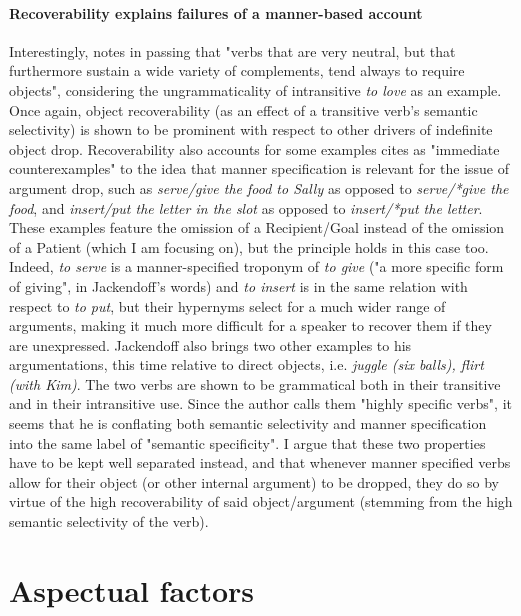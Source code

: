 \paragraph{Recoverability explains failures of a manner-based account}
Interestingly, \textcite[207]{Rice1988} notes in passing that "verbs that are very neutral, but that furthermore sustain a wide variety of complements, tend always to require objects", considering the ungrammaticality of intransitive \textit{to love} as an example. Once again, object recoverability (as an effect of a transitive verb's semantic selectivity) is shown to be prominent with respect to other drivers of indefinite object drop. Recoverability also accounts for some examples \textcite[134]{Jackendoff2003} cites as "immediate counterexamples" to the idea that manner specification is relevant for the issue of argument drop, such as \textit{serve/give the food to Sally} as opposed to \textit{serve/*give the food}, and \textit{insert/put the letter in the slot} as opposed to \textit{insert/*put the letter}. These examples feature the omission of a Recipient/Goal instead of the omission of a Patient (which I am focusing on), but the principle holds in this case too. Indeed, \textit{to serve} is a manner-specified troponym of \textit{to give} ("a more specific form of giving", in Jackendoff's words) and \textit{to insert} is in the same relation with respect to \textit{to put}, but their hypernyms select for a much wider range of arguments, making it much more difficult for a speaker to recover them if they are unexpressed. Jackendoff also brings two other examples to his argumentations, this time relative to direct objects, i.e. \textit{juggle (six balls), ﬂirt (with Kim)}. The two verbs are shown to be grammatical both in their transitive and in their intransitive use. Since the author calls them "highly specific verbs", it seems that he is conflating both semantic selectivity and manner specification into the same label of "semantic specificity". I argue that these two properties have to be kept well separated instead, and that whenever manner specified verbs allow for their object (or other internal argument) to be dropped, they do so by virtue of the high recoverability of said object/argument (stemming from the high semantic selectivity of the verb).


\section{Aspectual factors} 

